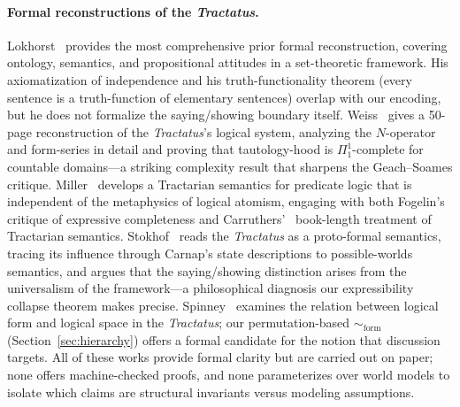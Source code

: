 \documentclass[10pt, letterpaper]{article}
\theoremstyle{definition}
\theoremstyle{remark}
\newcommand{\formEq}{\sim_{\mathrm{form}}}
\begin{document}
\paragraph{Formal reconstructions of the \emph{Tractatus}.}
Lokhorst~\cite{lokhorst1988} provides the most comprehensive
prior formal reconstruction, covering ontology, semantics, and
propositional attitudes in a set-theoretic framework.  His
axiomatization of independence and his truth-functionality
theorem (every sentence is a truth-function of elementary
sentences) overlap with our encoding, but he does not formalize
the saying/showing boundary itself.
Weiss~\cite{weiss2017} gives a 50-page reconstruction of the
\emph{Tractatus}'s logical system, analyzing the $N$-operator
and form-series in detail and proving that tautology-hood is
$\Pi^1_1$-complete for countable domains---a striking
complexity result that sharpens the Geach--Soames critique.
Miller~\cite{miller1995} develops a Tractarian semantics for
predicate logic that is independent of the metaphysics of
logical atomism, engaging with both Fogelin's~\cite{fogelin1987}
critique of expressive completeness and Carruthers'~\cite{carruthers1989}
book-length treatment of Tractarian semantics.
Stokhof~\cite{stokhof2008} reads the \emph{Tractatus} as a
proto-formal semantics, tracing its influence through Carnap's
state descriptions to possible-worlds semantics, and argues
that the saying/showing distinction arises from the
universalism of the framework---a philosophical diagnosis our
expressibility collapse theorem makes precise.
Spinney~\cite{spinney2022} examines the relation between logical
form and logical space in the \emph{Tractatus}; our
permutation-based $\formEq$ (Section~\ref{sec:hierarchy})
offers a formal candidate for the notion that discussion
targets.
All of these works provide formal clarity but are carried out
on paper; none offers machine-checked proofs, and none
parameterizes over world models to isolate which claims are
structural invariants versus modeling assumptions.
\end{document}
